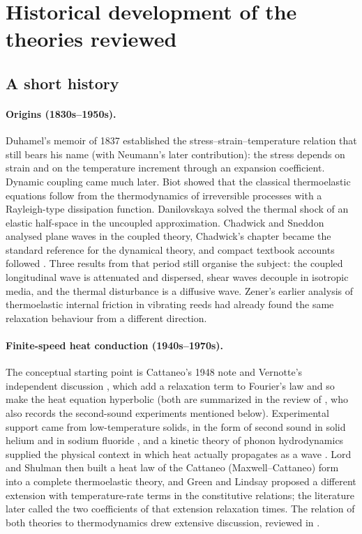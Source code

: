 \section{Historical development of the theories reviewed}\label{sec:history}
\subsection{A short history}
\paragraph{Origins (1830s--1950s).} Duhamel's memoir of 1837 \citep{Duhamel1837} established the stress--strain--temperature relation that still bears his name (with Neumann's later contribution): the stress depends on strain and on the temperature increment through an expansion coefficient. Dynamic coupling came much later. Biot \citep{Biot1956} showed that the classical thermoelastic equations follow from the thermodynamics of irreversible processes with a Rayleigh-type dissipation function. Danilovskaya \citep{Danilovskaya1950} solved the thermal shock of an elastic half-space in the uncoupled approximation. Chadwick and Sneddon \citep{ChadwickSneddon1958} analysed plane waves in the coupled theory, Chadwick's chapter \citep{Chadwick1960} became the standard reference for the dynamical theory, and compact textbook accounts followed \citep{Boley1960,Nowacki1975,Carlson1972}. Three results from that period still organise the subject: the coupled longitudinal wave is attenuated and dispersed, shear waves decouple in isotropic media, and the thermal disturbance is a diffusive wave. Zener's earlier analysis of thermoelastic internal friction in vibrating reeds \citep{Zener1937} had already found the same relaxation behaviour from a different direction.

\paragraph{Finite-speed heat conduction (1940s--1970s).} The conceptual starting point is Cattaneo's 1948 note \citep{Cattaneo1948} and Vernotte's independent discussion \citep{Vernotte1958}, which add a relaxation term to Fourier's law and so make the heat equation hyperbolic (both are summarized in the review of \citet{Chandrasekharaiah1986}, who also records the second-sound experiments mentioned below). Experimental support came from low-temperature solids, in the form of second sound in solid helium and in sodium fluoride \citep{Ackerman1966,Jackson1970}, and a kinetic theory of phonon hydrodynamics supplied the physical context in which heat actually propagates as a wave \citep{GuyerKrumhansl1966,GuyerKrumhansl1966II,Chester1963}. Lord and Shulman \citep{Lord1967} then built a heat law of the Cattaneo (Maxwell--Cattaneo) form into a complete thermoelastic theory, and Green and Lindsay \citep{Green1972} proposed a different extension with temperature-rate terms in the constitutive relations; the literature later called the two coefficients of that extension relaxation times. The relation of both theories to thermodynamics drew extensive discussion, reviewed in \citep{Chandrasekharaiah1986,Joseph1989,Joseph1990}.

